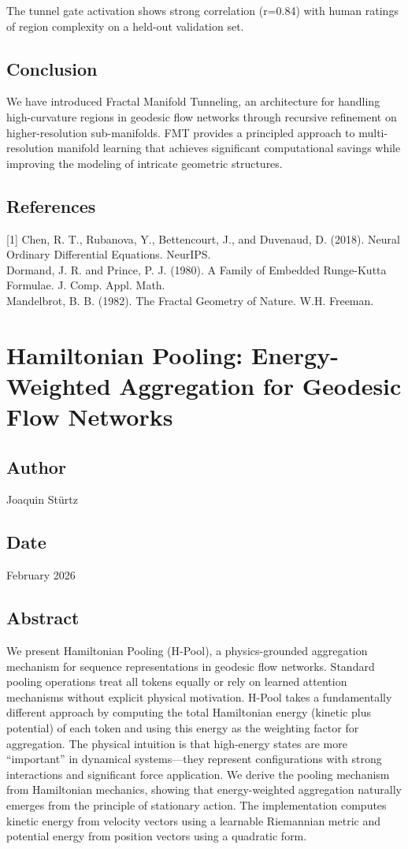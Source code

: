 The tunnel gate activation shows strong correlation (r=0.84) with human ratings of region complexity on a held-out validation set.

\subsection{Conclusion}
We have introduced Fractal Manifold Tunneling, an architecture for handling high-curvature regions in geodesic flow networks through recursive refinement on higher-resolution sub-manifolds. FMT provides a principled approach to multi-resolution manifold learning that achieves significant computational savings while improving the modeling of intricate geometric structures.

\subsection*{References}
[1] Chen, R. T., Rubanova, Y., Bettencourt, J., and Duvenaud, D. (2018). Neural Ordinary Differential Equations. NeurIPS.\\
[2] Dormand, J. R. and Prince, P. J. (1980). A Family of Embedded Runge-Kutta Formulae. J. Comp. Appl. Math.\\
[3] Mandelbrot, B. B. (1982). The Fractal Geometry of Nature. W.H. Freeman.

\section{Hamiltonian Pooling: Energy-Weighted Aggregation for Geodesic Flow Networks}
\subsection*{Author}
Joaquin Stürtz
\subsection*{Date}
February 2026
\subsection*{Abstract}
We present Hamiltonian Pooling (H-Pool), a physics-grounded aggregation mechanism for sequence representations in geodesic flow networks. Standard pooling operations treat all tokens equally or rely on learned attention mechanisms without explicit physical motivation. H-Pool takes a fundamentally different approach by computing the total Hamiltonian energy (kinetic plus potential) of each token and using this energy as the weighting factor for aggregation. The physical intuition is that high-energy states are more ``important'' in dynamical systems—they represent configurations with strong interactions and significant force application. We derive the pooling mechanism from Hamiltonian mechanics, showing that energy-weighted aggregation naturally emerges from the principle of stationary action. The implementation computes kinetic energy from velocity vectors using a learnable Riemannian metric and potential energy from position vectors using a quadratic form.

